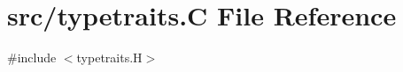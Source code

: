 \hypertarget{typetraits_8_c}{}\section{src/typetraits.C File Reference}
\label{typetraits_8_c}
{\ttfamily \#include $<$typetraits.\+H$>$}\newline
